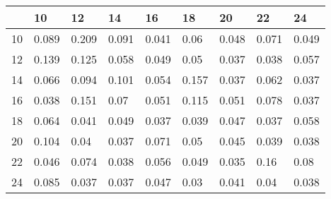 \begin{table}[!h]
\begin{tabular}{|p{}|p{}|p{}|p{}|p{}|p{}|p{}|p{}|p{}|}
\hline
& 10& 12& 14& 16& 18& 20& 22& 24\\ \hline10 & 0.089& 0.209& 0.091& 0.041& 0.06& 0.048& 0.071& 0.049\\ \hline
12 & 0.139& 0.125& 0.058& 0.049& 0.05& 0.037& 0.038& 0.057\\ \hline
14 & 0.066& 0.094& 0.101& 0.054& 0.157& 0.037& 0.062& 0.037\\ \hline
16 & 0.038& 0.151& 0.07& 0.051& 0.115& 0.051& 0.078& 0.037\\ \hline
18 & 0.064& 0.041& 0.049& 0.037& 0.039& 0.047& 0.037& 0.058\\ \hline
20 & 0.104& 0.04& 0.037& 0.071& 0.05& 0.045& 0.039& 0.038\\ \hline
22 & 0.046& 0.074& 0.038& 0.056& 0.049& 0.035& 0.16& 0.08\\ \hline
24 & 0.085& 0.037& 0.037& 0.047& 0.03& 0.041& 0.04& 0.038\\ \hline
\end{tabular}
\end{table}
